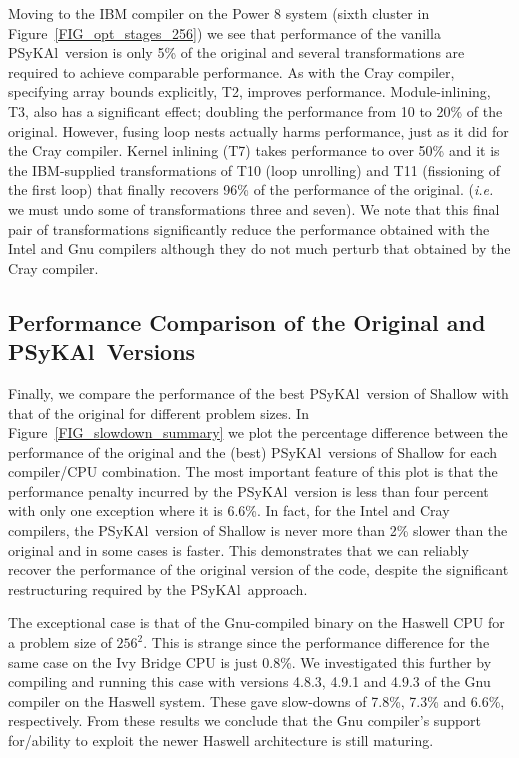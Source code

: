 \documentclass{IOS-Book-Article}
\newcommand{\psykal}{{PS}y{KA}l}
\begin{document}
Moving to the IBM compiler on the Power 8 system (sixth cluster in
Figure~\ref{FIG_opt_stages_256}) we see that performance of the
vanilla \psykal\ version is only 5\% of the original and several
transformations are required to achieve comparable performance. As
with the Cray compiler, specifying array bounds explicitly, T2, improves
performance. Module-inlining, T3, also has a significant effect; doubling
the performance from 10 to 20\% of the original. However, fusing loop
nests actually harms performance, just as it did for the Cray
compiler. Kernel inlining (T7) takes performance to over 50\% and it is the
IBM-supplied transformations of T10 (loop unrolling) and T11 (fissioning of the
first loop) that finally recovers 96\% of the performance of the
original. (\textit{i.e.} we must undo some of transformations three and
seven). We note that this final pair of transformations significantly
reduce the performance obtained with the Intel and Gnu compilers
although they do not much perturb that obtained by the Cray
compiler.

\subsection{Performance Comparison of the Original and \psykal\ Versions}

Finally, we compare the performance of the best \psykal\ version of
Shallow with that of the original for different problem sizes. In
Figure~\ref{FIG_slowdown_summary} we plot the percentage
  difference between the performance of the original and the (best)
\psykal\ versions of Shallow for each compiler/CPU combination. The
most important feature of this plot is that the performance penalty
incurred by the \psykal\ version is less than four percent with only
one exception where it is 6.6\%.  In fact, for the Intel and Cray
compilers, the \psykal\ version of Shallow is never more than 2\%
slower than the original and in some cases is faster.  This
demonstrates that we can reliably recover the performance of the
original version of the code, despite the significant restructuring
required by the \psykal\ approach.

The exceptional case is that of the Gnu-compiled binary on the Haswell
CPU for a problem size of $256^2$.  This is strange since the
performance difference for the same case on the Ivy Bridge CPU is just
0.8\%. We investigated this further by compiling and running this case
with versions 4.8.3, 4.9.1 and 4.9.3 of the Gnu compiler on the
Haswell system. These gave slow-downs of 7.8\%, 7.3\% and 6.6\%,
respectively. From these results we conclude that the Gnu compiler's
support for/ability to exploit the newer Haswell architecture is still
maturing.
\end{document}
